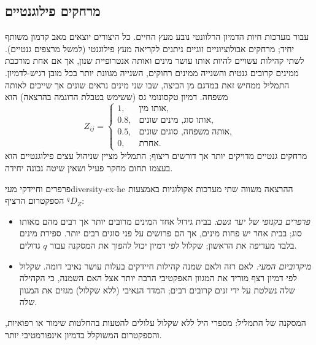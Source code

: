 \subsection*{מרחקים פילוגנטיים}
עבור מערכות חיות הדמיון הרלוונטי נובע מעץ החיים. כל היצורים יוצאים מאב קדמון משותף יחיד; מרחקים אבולוציוניים זוגיים ניתנים לקריאה מעץ פילוגנטי (למשל מרצפים גנטיים). לשתי קהילות עשויים להיות אותו עושר מינים ואותה אנטרופיית שנון, אך אם אחת מורכבת ממינים קרובים גנטית והשנייה ממינים רחוקים, השנייה מגוונת יותר בכל מובן רגיש-לדמיון. התמליל ממחיש זאת במדגם מן הביצה, שבו שני מינים נראים שונים אך שייכים לאותה משפחה.
דמיון טקסונומי גס (ששימש בטבלת הדוגמה בהרצאה) הוא
\begin{equation}\label{eq:he-bio-taxsim}
Z_{ij}=
\begin{cases}
1, & \text{אותו מין},\\
0.8,& \text{אותו סוג, מינים שונים},\\
0.5,& \text{אותה משפחה, סוגים שונים},\\
0,  & \text{אחרת}.
\end{cases}
\end{equation}
מרחקים גנטיים מדויקים יותר אך דורשים ריצוף; התמליל מציין שניהול עצים פילוגנטיים הוא בעצמו תחום מחקר פעיל ושאין שיטה נכונה יחידה.
\begin{example}{פרפרים וחיידקי מעי}{diversity-ex-he}
ההרצאה משווה שתי מערכות אקולוגיות באמצעות הספקטרום הרציף \({}^{q}D_Z\):
\begin{itemize}
\item \emph{פרפרים בקנופי של יער גשם:} בבית גידול אחד המינים מרובים יותר אך רבים מהם מאותו סוג; בבית אחר יש פחות מינים, אך הם פרושים על פני סוגים רבים יותר. ספירת מינים בלבד מעדיפה את הראשון; שקלול לפי דמיון יכול להפוך את המסקנה עבור \(q\) גדולים.
\item \emph{מיקרוביום המעי:} לאם רזה ולאם שמנה קהילות חיידקים בעלות עושר נאיבי דומה. שקלול לפי דמיון רצף מוריד את המגוון האפקטיבי הרבה יותר אצל האם השמנה, כי הקהילה שלה נשלטת על ידי זנים קרובים רבים; המדד הנאיבי (ללא שקלול) מגזים את המגוון שלה.
\end{itemize}
המסקנה של התמליל: מספרי היל ללא שקלול עלולים להטעות בהחלטות שימור או רפואיות, והספקטרום המשוקלל בדמיון אינפורמטיבי יותר.
\end{example}

